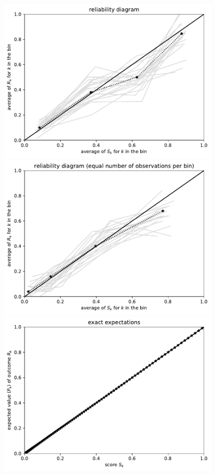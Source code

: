 \documentclass{article}
\begin{document}
\begin{figure}
\begin{centering}
\parbox{\imsize}{\includegraphics[width=\imsize]
                {./codes/unweighted/100_4_1_3/equiprob.pdf}}
\quad\quad
\parbox{\imsize}{\includegraphics[width=\imsize]
                {./codes/unweighted/100_4_1_3/equisamp.pdf}}

\vspace{\vertsep}

\parbox{\imsize}{\includegraphics[width=\imsize]
                {./codes/unweighted/100_4_1_3/exact.pdf}}


\end{centering}
\end{figure}
\end{document}

